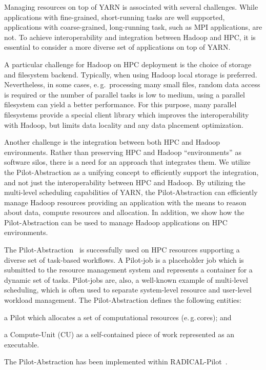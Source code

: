 Managing resources on top of YARN is associated with several challenges.
While applications with fine-grained, short-running tasks are well supported, applications with coarse-grained, long-running task, such as MPI applications, are not.
To achieve interoperability and integration between Hadoop and HPC, it is essential to consider a more diverse set of applications on top of YARN.

A particular challenge for Hadoop on HPC deployment is the choice of storage and filesystem backend.
Typically, when using Hadoop local storage is preferred.
Nevertheless, in some cases, e.\,g.\ processing many small files, random data access is required or the number of parallel tasks is low to medium, using a parallel filesystem can yield a better performance.
For this purpose, many parallel filesystems provide a special client library which improves the interoperability with Hadoop, but limits data locality and any data placement optimization.

Another challenge is the integration between both HPC and Hadoop environments.
Rather than preserving HPC and Hadoop ``environments'' as software silos, there is a need for an approach that integrates them. 
We utilize the Pilot-Abstraction as a unifying concept to efficiently support the integration, and not just the interoperability between HPC and Hadoop.
By utilizing the multi-level scheduling capabilities of YARN, the Pilot-Abstraction can efficiently manage Hadoop resources providing an application with the means to reason about data, compute resources and allocation.
In addition, we show how the Pilot-Abstraction can be used to manage Hadoop applications on HPC environments.

The Pilot-Abstraction~\cite{luckow2012pstar} is successfully used on HPC resources supporting a diverse set of task-based workflows.
A Pilot-job is a placeholder job which is submitted to the resource management system and represents a container for a dynamic set of tasks.
Pilot-jobs are, also, a well-known example of multi-level scheduling, which is often used to separate system-level resource and user-level workload management.
The Pilot-Abstraction defines the following entities:
\begin{inparaenum} [1)]
    \item a Pilot which allocates a set of computational resources (e.\,g.\,cores); and
    \item  a Compute-Unit (CU) as a self-contained piece of work represented as an executable.
\end{inparaenum}
The Pilot-Abstraction has been implemented within RADICAL-Pilot~\cite{merzky2018design}.


